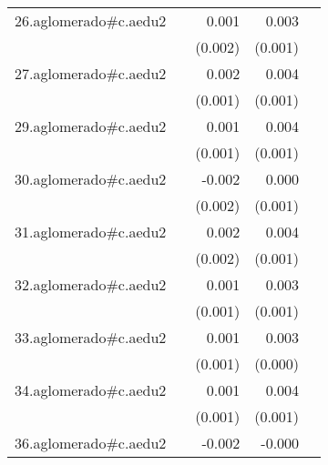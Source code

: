 {\begin{longtable}{l*{4}{D{.}{.}{-1}}}
\addlinespace
26.aglomerado#c.aedu2&                     &       0.001         &       0.003\sym{*}  &                     \\
            &                     &     (0.002)         &     (0.001)         &                     \\
\addlinespace
27.aglomerado#c.aedu2&                     &       0.002         &       0.004\sym{***}&                     \\
            &                     &     (0.001)         &     (0.001)         &                     \\
\addlinespace
29.aglomerado#c.aedu2&                     &       0.001         &       0.004\sym{***}&                     \\
            &                     &     (0.001)         &     (0.001)         &                     \\
\addlinespace
30.aglomerado#c.aedu2&                     &      -0.002         &       0.000         &                     \\
            &                     &     (0.002)         &     (0.001)         &                     \\
\addlinespace
31.aglomerado#c.aedu2&                     &       0.002         &       0.004\sym{**} &                     \\
            &                     &     (0.002)         &     (0.001)         &                     \\
\addlinespace
32.aglomerado#c.aedu2&                     &       0.001         &       0.003\sym{***}&                     \\
            &                     &     (0.001)         &     (0.001)         &                     \\
\addlinespace
33.aglomerado#c.aedu2&                     &       0.001         &       0.003\sym{***}&                     \\
            &                     &     (0.001)         &     (0.000)         &                     \\
\addlinespace
34.aglomerado#c.aedu2&                     &       0.001         &       0.004\sym{***}&                     \\
            &                     &     (0.001)         &     (0.001)         &                     \\
\addlinespace
36.aglomerado#c.aedu2&                     &      -0.002         &      -0.000         &                     \\

\end{longtable}}
